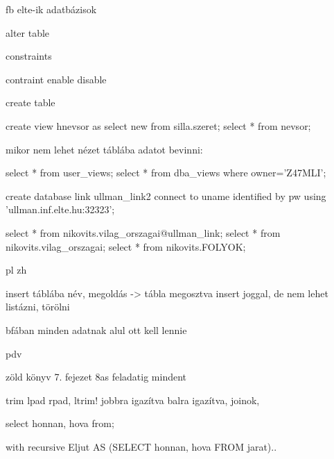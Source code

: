 fb elte-ik adatbázisok

alter table


constraints

contraint enable disable


create table

create view hnevsor as select new from silla.szeret;
select * from nevsor;

mikor nem lehet nézet táblába adatot bevinni:

select * from user_views;
select * from dba_views where owner='Z47MLI';


create database link ullman_link2 connect to uname identified by pw using 'ullman.inf.elte.hu:32323';


select * from nikovits.vilag_orszagai@ullman_link;
select * from nikovits.vilag_orszagai;
select * from nikovits.FOLYOK;


pl zh

insert táblába név, megoldás -> tábla megosztva insert joggal, de nem lehet listázni, törölni


bfában minden adatnak alul ott kell lennie


pdv

zöld könyv
7. fejezet 8as feladatig mindent

trim lpad rpad, ltrim!
jobbra igazítva balra igazítva, joinok, 

select honnan, hova from;

with recursive Eljut AS (SELECT honnan, hova FROM jarat)..

